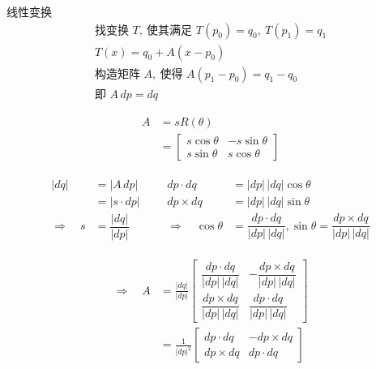 	\begin{lecture}{线性变换}
	\[
	\begin{array}{c}
	\text{找变换 } T,\ \text{使其满足 } T(p_0)=q_0,\ T(p_1)=q_1\\
	T(x)=q_0+A(x-p_0)\\
	\text{构造矩阵 } A,\ \text{使得 } A(p_1-p_0)=q_1-q_0\\
	\text{即 } A\,dp=dq
	\end{array}
	\]

	\[
	\begin{aligned}
	A &= sR(\theta)\\
	&=
	\begin{bmatrix}
	s\cos\theta & -s\sin\theta\\
	s\sin\theta & s\cos\theta
	\end{bmatrix}
	\end{aligned}
	\]

	\[
	\begin{array}{lll}
	\begin{aligned}
	|dq| &= |A\,dp|\\
	&= |s\cdot dp|\\
	\Rightarrow\quad s &= \dfrac{|dq|}{|dp|}
	\end{aligned}
	&&
	\begin{aligned}
	dp\cdot dq &= |dp|\,|dq|\cos\theta\\
	dp\times dq &= |dp|\,|dq|\sin\theta\\
	\Rightarrow\quad
	\cos\theta &= \dfrac{dp\cdot dq}{|dp|\,|dq|},
	\sin\theta = \dfrac{dp\times dq}{|dp|\,|dq|}
	\end{aligned}
	\end{array}
	\]

	\[
	\begin{aligned}
	\Rightarrow\quad
	A
	&= \frac{|dq|}{|dp|}
	\begin{bmatrix}
	\dfrac{dp\cdot dq}{|dp|\,|dq|}
	&
	-\dfrac{dp\times dq}{|dp|\,|dq|}
	\\[6pt]
	\dfrac{dp\times dq}{|dp|\,|dq|}
	&
	\dfrac{dp\cdot dq}{|dp|\,|dq|}
	\end{bmatrix}
	\\
	&=
	\frac{1}{|dp|^2}
	\begin{bmatrix}
	dp\cdot dq & -dp\times dq\\
	dp\times dq & dp\cdot dq
	\end{bmatrix}
	\end{aligned}
	\]


\end{lecture}
